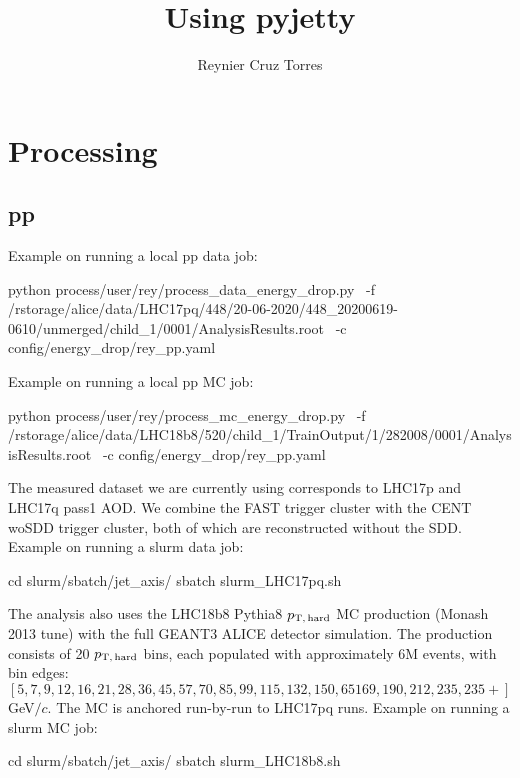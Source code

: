 \documentclass[12pt]{article}
\title{Using pyjetty}
\author{Reynier Cruz Torres}
\newcommand{\pThard}{$p_{\rm T, \, hard}$}
\newcommand{\GeVc}{GeV$/c$}
\begin{document}
\maketitle

\tableofcontents

\newpage
\section{Processing}

\subsection{pp}
Example on running a local pp data job:

\begin{tcolorbox}
\begin{verbnobox}[\scriptsize]
python process/user/rey/process_data_energy_drop.py \
-f /rstorage/alice/data/LHC17pq/448/20-06-2020/448_20200619-0610/unmerged/child_1/0001/AnalysisResults.root \
-c config/energy_drop/rey_pp.yaml
\end{verbnobox}  
\end{tcolorbox}

Example on running a local pp MC job:
\begin{tcolorbox}
\begin{verbnobox}[\scriptsize]
python process/user/rey/process_mc_energy_drop.py \
-f /rstorage/alice/data/LHC18b8/520/child_1/TrainOutput/1/282008/0001/AnalysisResults.root \
-c config/energy_drop/rey_pp.yaml
\end{verbnobox}  
\end{tcolorbox}

The measured dataset we are currently using corresponds to LHC17p and LHC17q pass1 AOD. We combine the FAST
trigger cluster with the CENT woSDD trigger cluster, both of which are reconstructed without the SDD.
Example on running a slurm data job:
\begin{tcolorbox}
\begin{verbnobox}[\scriptsize]
cd slurm/sbatch/jet_axis/
sbatch slurm_LHC17pq.sh
\end{verbnobox}  
\end{tcolorbox}

The analysis also uses the LHC18b8 Pythia8 \pThard{} MC production (Monash 2013 tune) with the full
GEANT3 ALICE detector simulation. The production consists of 20 \pThard{} bins, each populated with
approximately 6M events, with bin edges: $[5, 7, 9, 12, 16, 21, 28, 36, 45, 57, 70, 85, 99, 115, 132, 150,
65 169, 190, 212, 235, 235+]$ \GeVc. The MC is anchored run-by-run to LHC17pq runs.
Example on running a slurm MC job:
\begin{tcolorbox}
\begin{verbnobox}[\scriptsize]
cd slurm/sbatch/jet_axis/
sbatch slurm_LHC18b8.sh
\end{verbnobox}  
\end{tcolorbox}
\end{document}
